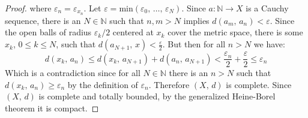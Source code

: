 \documentclass{article}
\theoremstyle{plain}
\theoremstyle{normal}
\begin{document}
\begin{proof}
            where $\varepsilon_{n}=\varepsilon_{x_{n}}$. Let
            $\varepsilon=\textrm{min}(\varepsilon_{0},\,\dots,\,\varepsilon_{N})$.
            Since $a:\mathbb{N}\rightarrow{X}$ is a Cauchy sequence, there is
            an $N\in\mathbb{N}$ such that $n,m>N$ implies
            $d(a_{m},\,a_{n})<\varepsilon$. Since the open balls of
            radius $\varepsilon_{k}/2$ centered at $x_{k}$ cover the metric
            space, there is some $x_{k}$, $0\leq{k}\leq{N}$, such that
            $d(a_{N+1},\,x)<\frac{\varepsilon}{2}$. But then for all
            $n>N$ we have:
            \begin{equation}
                d(x_{k},\,a_{n})\leq{d}(x_{k},\,a_{N+1})+d(a_{n},\,a_{N+1})
                    <\frac{\varepsilon_{n}}{2}+\frac{\varepsilon}{2}
                    \leq\varepsilon_{n}
            \end{equation}
            Which is a contradiction since for all $N\in\mathbb{N}$ there is
            an $n>N$ such that $d(x_{k},\,a_{n})\geq\varepsilon_{n}$ by
            the definition of $\varepsilon_{n}$. Therefore
            $(X,\,d)$ is complete. Since $(X,\,d)$ is complete and totally
            bounded, by the generalized Heine-Borel theorem it is compact.
        \end{proof}
\end{document}
